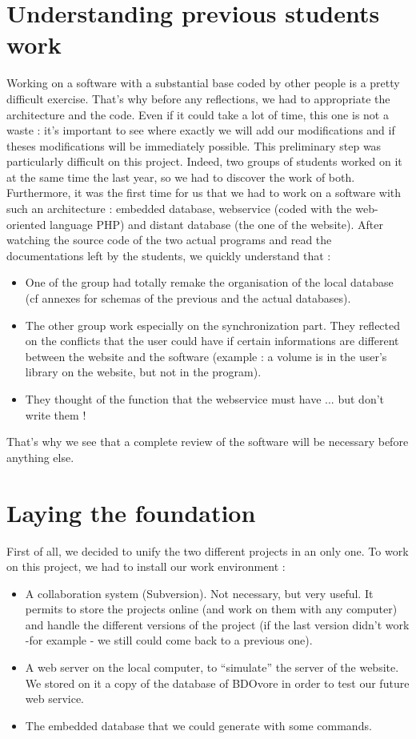 \documentclass[11pt]{report} %
\begin{document}
\section{Understanding previous students work}
Working on a software with a substantial base coded by other people is a pretty difficult exercise. That's why before any reflections, we had to appropriate the architecture and the code. Even if it could take a lot of time, this one is not a waste : it's important to see where exactly we will add our modifications and if theses modifications will be immediately possible. \newline
This preliminary step was particularly difficult on this project. Indeed, two groups of students worked on it at the same time the last year, so we had to discover the work of both. Furthermore, it was the first time for us that we had to work on a software with such an architecture : embedded database, webservice (coded with the web-oriented language PHP) and distant database (the one of the website).\newline
After watching the source code of the two actual programs and read the documentations left by the students, we quickly understand that :

\begin{itemize}
\item One of the group had totally remake the organisation of the local database (cf annexes for schemas of the previous and the actual databases).
\item The other group work especially on the synchronization part. They reflected on the conflicts that the user could have if certain informations are different between the website and the software (example : a volume is in the user's library on the website, but not in the program).
\item They thought of the function that the webservice must have ... but don't write them !
\end{itemize}

That's why we see that a complete review of the software will be necessary before anything else.

\section{Laying the foundation}
First of all, we decided to unify the two different projects in an only one. To work on this project, we had to install our work environment :

\begin{itemize}
\item A collaboration system (Subversion). Not necessary, but very useful. It permits to store the projects online (and work on them with any computer) and handle the different versions of the project (if the last version didn't work -for example - we still could come back to a previous one).
\item A web server on the local computer, to ``simulate'' the server of the website. We stored on it a copy of the database of BDOvore in order to test our future web service.
\item The embedded database that we could generate with some commands.
\end{itemize}
\end{document}
